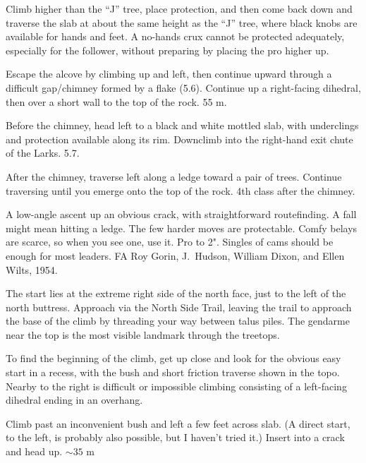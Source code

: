 \documentclass{tahquitz}
\begin{document}
 Climb higher than the ``J'' tree, place protection, and then come
back down and traverse the slab at about the same height as the ``J'' tree, where black
knobs are available for hands and feet. A no-hands crux cannot be protected adequately,
especially for the follower, without preparing by placing the pro higher up.

 Escape the alcove by climbing up and left, then continue upward through a
difficult gap/chimney formed by a flake (5.6). Continue up a right-facing dihedral, then
over a short wall to the top
of the rock. 55 m.

 Before the chimney, head left to a black and white mottled slab, with underclings
and protection available along its rim. Downclimb into the right-hand exit chute of the Larks. 5.7.

 After the chimney, traverse left along a ledge toward a pair of trees. Continue
traversing until you emerge onto the top of the rock. 4th class after the chimney.




A low-angle ascent up an obvious crack, with straightforward routefinding.
A fall might mean hitting a ledge. The few harder moves
are protectable. Comfy belays are scarce, so when you see one, use
it. Pro to 2". Singles of cams should be enough for most leaders.
FA Roy Gorin, J.~Hudson, William Dixon, and Ellen Wilts, 1954.

The start lies at  the extreme right side of the north face, just to
the left of the north buttress. Approach via the North Side Trail,
leaving the trail to approach the base of the climb by threading your
way between talus piles. The gendarme near the top is the most
visible landmark through the treetops.

To find the beginning of the climb, get up close and look for the
obvious easy start in a recess, with the bush and short friction
traverse shown in the topo. Nearby to the right is difficult or
impossible climbing consisting of a left-facing dihedral ending in an
overhang. 

 Climb past an inconvenient bush and left a few feet across slab.
(A direct start, to the left, is probably also possible, but I haven't tried it.)
Insert into a crack and head up. $\sim 35$ m
\end{document}
